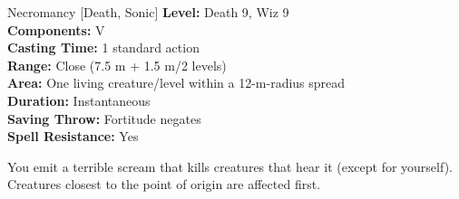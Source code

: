 {Necromancy [Death, Sonic]}
{
	\textbf{Level:}
	Death 9, Wiz 9\\
	\textbf{Components:}
	V\\
	\textbf{Casting Time:}
	1 standard action\\
	\textbf{Range:}
	Close (7.5 m + 1.5 m/2 levels)\\
	\textbf{Area:}
	One living creature/level within a 12-m-radius spread\\
	\textbf{Duration:}
	Instantaneous\\
	\textbf{Saving Throw:}
	Fortitude negates\\
	\textbf{Spell Resistance:}
	Yes\\
}
{
	You emit a terrible scream that kills creatures that hear it (except for yourself). Creatures closest to the point of origin are affected first.

}
